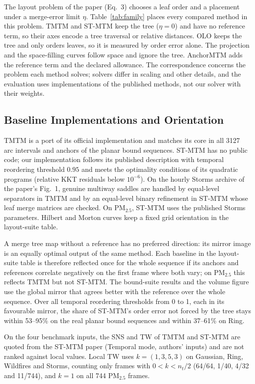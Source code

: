 \documentclass[preprint]{vgtc}   %
\begin{document}
The layout problem of the paper (Eq.~3) chooses a leaf order and a placement under a merge-error limit $\eta$. Table~\ref{tab:family} places every compared method in this problem. TMTM and ST-MTM keep the tree ($\eta=0$) and have no reference term, so their axes encode a tree traversal or relative distances. OLO keeps the tree and only orders leaves, so it is measured by order error alone. The projection and the space-filling curves follow space and ignore the tree. AnchorMTM adds the reference term and the declared allowance. The correspondence concerns the problem each method solves; solvers differ in scaling and other details, and the evaluation uses implementations of the published methods, not our solver with their weights.

\subsection{Baseline Implementations and Orientation}\label{sec:baselines}
TMTM is a port of its official implementation and matches its core in all 3127 arc intervals and anchors of the planar bound sequences. ST-MTM has no public code; our implementation follows its published description with temporal reordering threshold $0.95$ and meets the optimality conditions of its quadratic programs (relative KKT residuals below $10^{-6}$). On the hourly Storms archive of the paper's Fig.~1, genuine multiway saddles are handled by equal-level separators in TMTM and by an equal-level binary refinement in ST-MTM whose leaf merge matrices are checked. On PM$_{2.5}$, ST-MTM uses the published Storms parameters. Hilbert and Morton curves keep a fixed grid orientation in the layout-suite table.

A merge tree map without a reference has no preferred direction: its mirror image is an equally optimal output of the same method. Each baseline in the layout-suite table is therefore reflected once for the whole sequence if its anchors and references correlate negatively on the first frame where both vary; on PM$_{2.5}$ this reflects TMTM but not ST-MTM. The bound-suite results and the volume figure use the global mirror that agrees better with the reference over the whole sequence. Over all temporal reordering thresholds from 0 to 1, each in its favourable mirror, the share of ST-MTM's order error not forced by the tree stays within 53--95\% on the real planar bound sequences and within 37--61\% on Ring.

On the four benchmark inputs, the SNS and TW of TMTM and ST-MTM are quoted from the ST-MTM paper (Temporal mode, authors' inputs) and are not ranked against local values. Local TW uses $k=(1,3,5,3)$ on Gaussian, Ring, Wildfires and Storms, counting only frames with $0<k<n_t/2$ (64/64, 1/40, 4/32 and 11/744), and $k=1$ on all 744 PM$_{2.5}$ frames.
\end{document}
